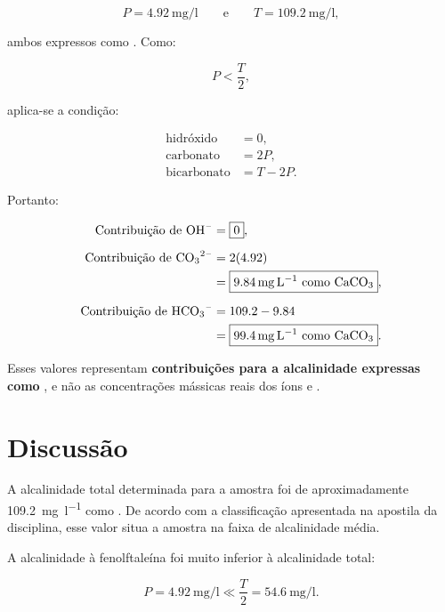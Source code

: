 \documentclass[a4paper,12pt]{article}
\begin{document}
\begin{equation}
P=\qty{4.92}{\milli\gram\per\litre}
\qquad\text{e}\qquad
T=\qty{109.2}{\milli\gram\per\litre},
\end{equation}

ambos expressos como . Como:

\begin{equation}
P<\frac{T}{2},
\end{equation}

aplica-se a condição:

\begin{align}
\text{hidróxido} &= 0,\\
\text{carbonato} &= 2P,\\
\text{bicarbonato} &= T-2P.
\end{align}

Portanto:

\begin{align}
\text{Contribuição de \ce{OH-}}
&=
\boxed{0},\\[0.2cm]
\text{Contribuição de \ce{CO3^2-}}
&=
2(4.92)\\
&=
\boxed{\qty{9.84}{\milli\gram\per\litre}\ \text{como \ce{CaCO3}}},\\[0.2cm]
\text{Contribuição de \ce{HCO3-}}
&=
109.2-9.84\\
&=
\boxed{\qty{99.4}{\milli\gram\per\litre}\ \text{como \ce{CaCO3}}}.
\end{align}

Esses valores representam \textbf{contribuições para a alcalinidade
expressas como }, e não as concentrações mássicas reais dos íons
 e .

\section{Discussão}

A alcalinidade total determinada para a amostra foi de aproximadamente
\qty{109.2}{\milli\gram\per\litre} como . De acordo com a
classificação apresentada na apostila da disciplina, esse valor situa a
amostra na faixa de alcalinidade média.

A alcalinidade à fenolftaleína foi muito inferior à alcalinidade total:

\begin{equation}
P=\qty{4.92}{\milli\gram\per\litre}
\ll
\frac{T}{2}
=
\qty{54.6}{\milli\gram\per\litre}.
\end{equation}
\end{document}
